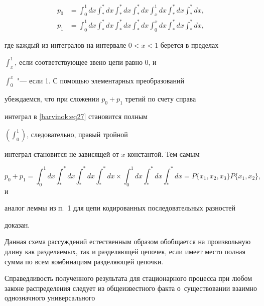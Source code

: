 \begin{equation}

\label{barvinok:eq27} \begin{aligned}

 p_0 &=\int _0^1 dx \int _\ast

^\ast dx \int _\ast^\ast dx\int _\ast^\ast dx

\int _x^1 dx \int _\ast^\ast dx \int _\ast^\ast

dx,\\

p_1 &=\int _0^1 dx \int _\ast^\ast dx

\int _\ast^\ast dx \int _\ast^\ast dx \int _0^x

dx \int _\ast^\ast dx \int _\ast^\ast dx,

\end{aligned}

\end{equation}

где каждый из интегралов на интервале $0<x<1$ берется в пределах

$\displaystyle \int _x^1$, если соответствующее звено цепи равно 0, и

$\displaystyle \int _0^x $ "--- если 1. С помощью элементарных преобразований

убеждаемся, что при сложении $p_0 +p_1$ третий по счету справа

интеграл в \eqref{barvinok:eq27} становится полным

$\displaystyle \left(\int _0^1 \right)$, следовательно, правый тройной

интеграл становится не зависящей от $x$ константой. Тем самым 

$$p_0

+p_1 =\int _0^1 \! dx \int _\ast^\ast \! dx \int _\ast

^\ast \! dx \int _\ast^\ast \! dx \times \int _0^1 \! dx

\int _\ast^\ast \! dx \int _\ast^\ast \! dx = P \{

x_1,x_2,x_3\} P \{x_1,x_2\},$$ и 

аналог леммы  из п.~1 для цепи кодированных последовательных  разностей

доказан. 



Данная схема рассуждений естественным образом обобщается на произвольную длину как разделяемых, так и разделяющей цепочек, если имеет место полная сумма по всем комбинациям разделяющей цепочки.

Справедливость полученного результата для стационарного процесса при любом законе распределения следует из общеизвестного факта о~существовании взаимно однозначного универсального

